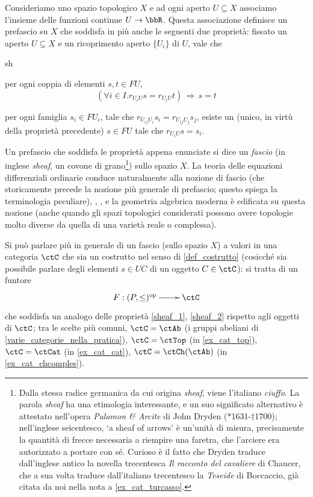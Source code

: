 Consideriamo uno spazio topologico \(X\) e ad ogni aperto \(U\subseteq X\) associamo l'insieme delle funzioni continue \(U\to \bbR\). Questa associazione definisce un prefascio su \(X\) che soddisfa in più anche le seguenti due proprietà: fissato un aperto \(U\subseteq X\) e un ricoprimento aperto \(\{U_i\}\) di \(U\), vale che
\begin{enumtag}{sh}
 \item \label{sheaf_1} per ogni coppia di elementi \(s,t \in FU\),
 \[(\forall i \in I.r_{U_iU}s = r_{U_iU} t) \,\Rightarrow\, s=t\]
 \item \label{sheaf_2} per ogni famiglia \(s_i \in FU_i\), tale che \(r_{U_{ij}U_i}s_i = r_{U_{ij}U_j}s_j\), esiste un (unico, in virtù della proprietà precedente) \(s\in FU\) tale che \(r_{U_iU}s=s_i\).
\end{enumtag}
\begin{remark}
 Un prefascio che soddisfa le proprietà appena enunciate si dice un \emph{fascio} (in inglese \emph{sheaf}, un covone di grano\footnote{Dalla stessa radice germanica da cui origina \emph{sheaf}, viene l'italiano \emph{ciuffo}. La parola \emph{sheaf} ha una etimologia interessante, e un suo significato alternativo è attestato nell'opera \emph{Palamon \& Arcite} di John Dryden (\(*\)1631-\(\dag\)1700); nell'inglese seicentesco, `a sheaf of arrows' è un'unità di misura, precisamente la quantità di frecce necessaria a riempire una faretra, che l'arciere era autorizzato a portare con sé. Curioso è il fatto che Dryden traduce dall'inglese antico la novella trecentesca \emph{Il racconto del cavaliere} di Chaucer, che a sua volta traduce dall'italiano trecentesco la \emph{Teseide} di Boccaccio, già citata da noi nella nota a \ref{ex_cat_turcasso}.}) sullo spazio \(X\). La teoria delle equazioni differenziali ordinarie conduce naturalmente alla nozione di fascio (che storicamente precede la nozione più generale di prefascio; questo spiega la terminologia peculiare), \cite[Cap. II]{mac1992sheaves}, \cite{Tennison1975,Borceux1994a,Borceux1989-gf,pedicchiofoundations}, e la geometria algebrica moderna è edificata su questa nozione (anche quando gli spazi topologici considerati possono avere topologie molto diverse da quella di una varietà reale o complessa).

 Si può parlare più in generale di un fascio (sullo spazio \(X\)) a valori in una categoria \(\ctC\) che sia un costrutto nel senso di \ref{def_costrutto} (cosicché sia possibile parlare degli elementi \(s\in UC\) di un oggetto \(C\in \ctC\)): si tratta di un funtore
 \[\xymatrix{F : (P,\le)^\op \ar[r] & \ctC}\]
 che soddisfa un analogo delle proprietà \ref{sheaf_1}, \ref{sheaf_2} rispetto agli oggetti di \(\ctC\); tra le scelte più comuni, \(\ctC=\ctAb\) (i gruppi abeliani di \ref{varie_categorie_nella_pratica}), \(\ctC=\ctTop\) (in \ref{ex_cat_top}), \(\ctC=\ctCat\) (in \ref{ex_cat_cat}), \(\ctC = \ctCh(\ctAb)\) (in \ref{ex_cat_chcomples}).
\end{remark}
